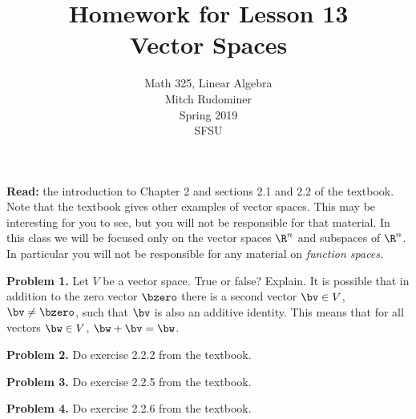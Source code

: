 \documentclass[oneside,12pt]{amsart}
\begin{document}
\title{Homework for Lesson 13 \\ Vector Spaces}
\author{Math 325, Linear Algebra \\ Mitch Rudominer \\ Spring 2019\\ SFSU }
\date{}

\maketitle

\textbf{Read:} the introduction to Chapter 2 and sections 2.1 and 2.2 of the textbook.
Note that the textbook gives other examples of vector spaces. This may be interesting
for you to see, but you will not be responsible for that material. In this class
we will be focused only on the vector spaces $\R^n$ and subspaces of $\R^n$.
In particular you will not be responsible for any material on \emph{function spaces.}

\bigskip


\textbf{Problem 1.} Let $V$ be a vector space. True or false? Explain. It is possible
that in addition to the zero vector $\bzero$ there is a second vector $\bv\in V$,
$\bv\not=\bzero$,
such that $\bv$ is also an additive identity. This means that for all
vectors $\bw\in V$, $\bw + \bv = \bw$.

\bigskip
\bigskip

\textbf{Problem 2.} Do exercise 2.2.2 from the textbook.

\bigskip
\bigskip
\bigskip

\textbf{Problem 3.} Do exercise 2.2.5 from the textbook.

\bigskip
\bigskip
\bigskip

\textbf{Problem 4.} Do exercise 2.2.6 from the textbook.
\end{document}

